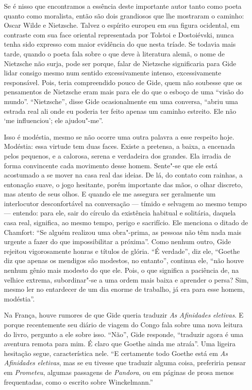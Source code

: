 Se é nisso que encontramos a essência deste importante autor tanto como
poeta quanto como moralista, então são dois grandiosos que lhe mostraram o
caminho: Oscar Wilde e Nietzsche. Talvez o espírito
europeu em sua figura ocidental, em contraste com sua face oriental
representada por Tolstoi e Dostoiévski, nunca tenha sido expresso com
maior evidência do que nesta tríade. Se todavia mais tarde, quando o
poeta fala sobre o que deve à literatura alemã, o nome de
Nietzsche não surja, pode ser porque, falar de Nietzsche
significaria para Gide lidar consigo mesmo num sentido excessivamente
intenso, excessivamente responsável. Pois, teria compreendido pouco de
Gide, quem não soubesse que os pensamentos de Nietzsche eram mais para
ele do que o esboço de uma ``visão do mundo''. ``Nietzsche'', disse Gide
ocasionalmente em uma conversa, ``abriu uma estrada real ali onde eu
poderia ter feito apenas um caminho estreito. Ele não `me influenciou';
ele ajudou"-me''.

Isso é modéstia, mesmo se não ocorre uma outra palavra a esse respeito hoje.
Modéstia: essa virtude tem duas faces. Existe a pretensa, a baixa, a
encenada pelos pequenos, e a calorosa, serena e verdadeira dos grandes. Ela
irradia de forma convincente cada movimento desse homem. Sente"-se que ele está
acostumado a se mover na casa real das ideias. De lá, do contato com
rainhas, a entonação suave, o jogo hesitante, porém importante das
mãos, o olhar discreto, mas atento de seus olhos. E quando ele me assegura
ser geralmente um interlocutor desconfortável na conversação --- tímido e
selvagem ao mesmo tempo --- entendo: para ele, sair do círculo da existência habitual e
solitária, daquela casa real, significa, ao mesmo
tempo, perigo e sacrifício. Ele menciona o ditado de Chamfort: ``Se alguém
realizou uma obra"-prima, as pessoas não têm nada mais urgente a fazer do
que impossibilitar a próxima''. Como nenhum outro, Gide rejeitou
vigorosamente honras e títulos de glória. ``É verdade'', diz ele,
``Goethe diz que apenas os mendigos são modestos, no entanto'', continua
ele, ``não houve nenhum gênio mais modesto do que ele. Pois, o que
significa a paciência de, na velhice extrema, subordinar"-se a uma ordem
mais baixa e aprender o persa? Sim, mesmo ler no entardecer de um dia
enorme de trabalho, já era para esse homem, modéstia''.

Na França, houve rumores de que Gide queria traduzir \emph{As Afinidades
eletivas}. E porque recentemente seu diário de viagem do Congo fala
sobre uma nova leitura do livro, pergunto a ele sobre isso. ``Não'',
Gide responde, ``traduzir agora é uma aventura remota para mim. É claro
que Goethe ainda me atraía''. Uma ligeira hesitação segue, característica
nele. ``E certamente todo Goethe está em \emph{As} \emph{Afinidades
eletivas}, mas se eu tivesse que traduzir alguma coisa, preferiria
pensar em \emph{Prometeu}, algumas passagens de \emph{Pandora}, ou em
páginas de prosa menos frequentadas, como o escrito sobre Winckelmann.''

